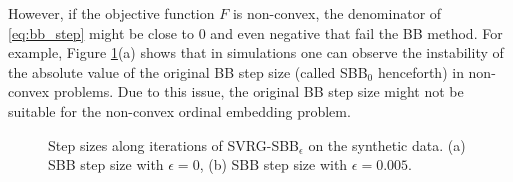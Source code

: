 \documentclass[letterpaper]{article} %
\begin{document}
However, if the objective function $F$ is non-convex, the denominator of \eqref{eq:bb_step} might be close to 0 and even negative that fail the BB method. For example, Figure \ref{fig:step}(a) shows that in simulations one can observe the instability of the absolute value of the original BB step size (called SBB$_0$ henceforth) in non-convex problems. Due to this issue, the original BB step size might not be suitable for the non-convex ordinal embedding problem.

\begin{figure}[!t]
	\centering
	\caption{Step sizes along iterations of SVRG-SBB$_\epsilon$ on the synthetic data. (a) SBB step size with $\epsilon=0$, (b) SBB step size with $\epsilon=0.005$.}
	\label{fig:step}
\end{figure}
%
%
\end{document}
